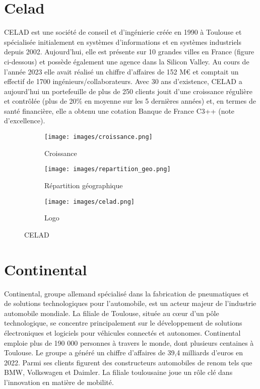 \documentclass[a4paper, 12pt]{report}
\begin{document}
\clearpage
\section{Celad}
CELAD est une société de conseil et d’ingénierie créée en 1990 à Toulouse et spécialisée
initialement en systèmes d’informations et en systèmes industriels depuis 2002. Aujourd’hui,
elle est présente sur 10 grandes villes en France (figure ci-dessous) et possède également une agence
dans la Silicon Valley. Au cours de l’année 2023 elle avait réalisé un chiffre d’affaires de 152
M€ et comptait un effectif de 1700 ingénieurs/collaborateurs. Avec 30 ans
d’existence, CELAD a aujourd’hui un portefeuille de plus de 250 clients jouit d’une croissance
régulière et contrôlée (plus de 20\% en moyenne sur les 5 dernières années) et, en termes de
santé financière, elle a obtenu une cotation Banque de France C3++ (note d’excellence).


 \begin{figure}[H]
             \centering
             \begin{subfigure}[t]{0.49\textwidth}
                 \centering
                 \texttt{[image: images/croissance.png]}
                 \caption{Croissance}
                 \label{filtre8}
             \end{subfigure}
             \hfill
             \begin{subfigure}[t]{0.49\textwidth}
             \centering
             \texttt{[image: images/repartition\_geo.png]}
             \caption{Répartition géographique}
            \label{filtre7}
             \end{subfigure}
             \hfill 
            \begin{subfigure}[t]{0.49\textwidth}
                 \centering
                 \texttt{[image: images/celad.png]}
                 \caption{Logo}
                 \label{filtre6}
             \end{subfigure}
             \hfill
             \centering
             \caption{CELAD}
                \label{filtres}
            \end{figure}

\newpage
\section{Continental}
Continental, groupe allemand spécialisé dans la fabrication de pneumatiques et de solutions technologiques pour l'automobile, est un acteur majeur de l'industrie automobile mondiale. La filiale de Toulouse, située au cœur d'un pôle technologique, se concentre principalement sur le développement de solutions électroniques et logiciels pour véhicules connectés et autonomes. Continental emploie plus de 190 000 personnes à travers le monde, dont plusieurs centaines à Toulouse. Le groupe a généré un chiffre d'affaires de 39,4 milliards d'euros en 2022. Parmi ses clients figurent des constructeurs automobiles de renom tels que BMW, Volkswagen et Daimler. La filiale toulousaine joue un rôle clé dans l'innovation en matière de mobilité.
\end{document}
